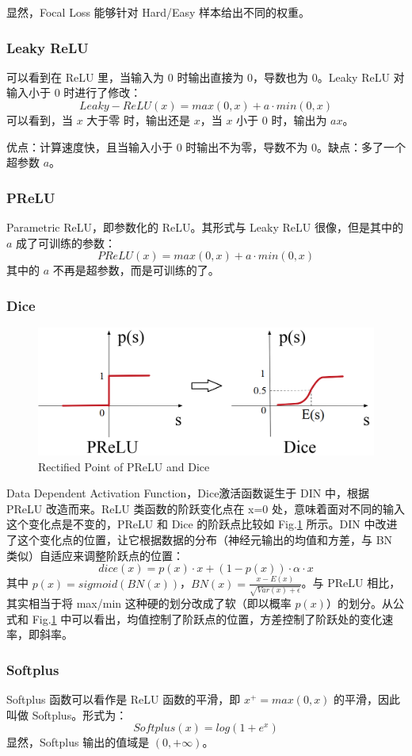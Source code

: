 显然，Focal Loss 能够针对 Hard/Easy 样本给出不同的权重。

\subsubsection{Leaky ReLU}
可以看到在 ReLU 里，当输入为 0 时输出直接为 0，导数也为 0。Leaky ReLU 对输入小于 0 时进行了修改：
$$
Leaky-ReLU(x) = max(0, x) + a \cdot min(0, x)
$$
可以看到，当 $x$ 大于零 时，输出还是 $x$，当 $x$ 小于 0 时，输出为 $a x$。

优点：计算速度快，且当输入小于 0 时输出不为零，导数不为 0。缺点：多了一个超参数 $a$。

\subsubsection{PReLU}
Parametric ReLU，即参数化的 ReLU。其形式与 Leaky ReLU 很像，但是其中的 $a$ 成了可训练的参数：
$$
PReLU(x) = max(0, x) + a \cdot min(0, x)
$$
其中的 $a$ 不再是超参数，而是可训练的了。

\subsubsection{Dice}
\begin{figure}[h]
	\centering
	\includegraphics[width=.6\textwidth]{pics/prelu-dice.png}
	\caption{Rectified Point of PReLU and Dice}
	\label{fig:prelu_dice}
\end{figure}
Data Dependent Activation Function，Dice激活函数诞生于 DIN 中，根据 PReLU 改造而来。ReLU 类函数的阶跃变化点在 x=0 处，意味着面对不同的输入这个变化点是不变的，PReLU 和 Dice 的阶跃点比较如 Fig.\ref{fig:prelu_dice} 所示。DIN 中改进了这个变化点的位置，让它根据数据的分布（神经元输出的均值和方差，与 BN 类似）自适应来调整阶跃点的位置：
$$
dice(x) = p(x) \cdot x + (1 - p(x)) \cdot \alpha \cdot x
$$
其中 $p(x) = sigmoid( BN(x))$，$BN(x) = \frac{x - E(x)}{\sqrt{Var(x) + \epsilon}}$。与 PReLU 相比，其实相当于将 max/min 这种硬的划分改成了软（即以概率 $p(x)$）的划分。从公式和 Fig.\ref{fig:prelu_dice} 中可以看出，均值控制了阶跃点的位置，方差控制了阶跃处的变化速率，即斜率。

\subsubsection{Softplus}
Softplus 函数可以看作是 ReLU 函数的平滑，即 $x^+ = max(0, x)$ 的平滑，因此叫做 Softplus。形式为：
$$
Softplus(x) = log(1+e^x)
$$
显然，Softplus 输出的值域是 $(0, +\infty)$。